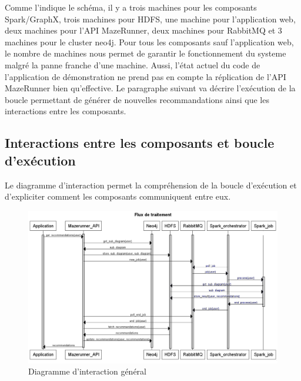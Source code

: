 Comme l'indique le schéma, il y a trois machines pour les composants Spark/GraphX, trois machines pour HDFS, une machine pour l'application web, deux machines pour l'API MazeRunner, deux machines pour RabbitMQ et 3 machines pour le cluster neo4j.
Pour tous les composants sauf l'application web, le nombre de machines nous permet de garantir le fonctionnement du systeme malgré la panne franche d'une machine. Aussi, l'état actuel du code de l'application de démonstration ne prend pas en compte la réplication de l'API MazeRunner bien qu'effective.
Le paragraphe suivant va décrire l'exécution de la boucle permettant de générer de nouvelles recommandations ainsi que les interactions entre les composants.

\subsection{Interactions entre les composants et boucle d'exécution}

Le diagramme d'interaction permet la compréhension de la boucle d'exécution et d'expliciter comment les composants communiquent entre eux.

\begin{figure}
    \centering
    \includegraphics[scale=0.4]{pics/diagramme_interaction.png}
    \caption{Diagramme d'interaction général}
\end{figure}

